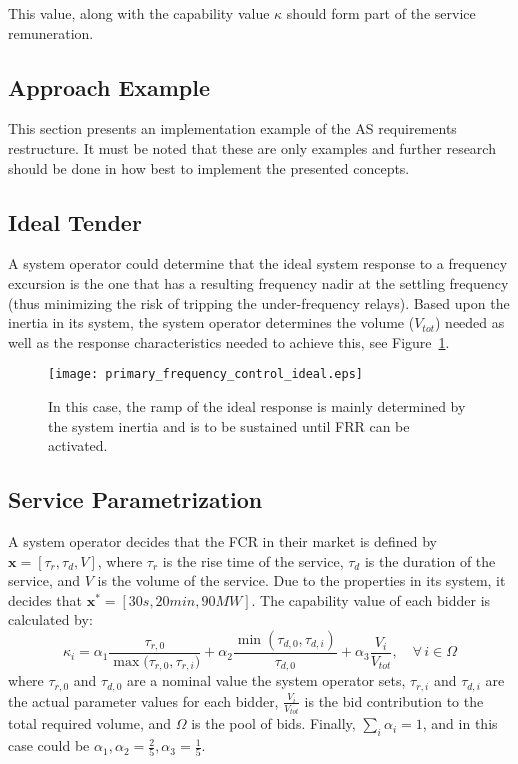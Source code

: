 This value, along with the capability value $\kappa$ should form part of the service remuneration. 
\subsection{Approach Example} %
\label{sub:ApproachExample}
This section presents an implementation example of the AS requirements restructure. It must be noted that these are only examples and further research should be done in how best to implement the presented concepts.
\subsection*{Ideal Tender}
A system operator could determine that the ideal system response to a frequency excursion is the one that has a resulting frequency nadir at the settling frequency (thus minimizing the risk of tripping the under-frequency relays). Based upon the inertia in its system, the system operator determines the volume ($V_{tot}$) needed as well as the response characteristics needed to achieve this, see Figure~\ref{fig:idealresponse}.

\begin{figure}[htbp!]
\centering
\texttt{[image: primary\_frequency\_control\_ideal.eps]}
\caption{In this case, the ramp of the ideal response is mainly determined by the system inertia and is to be sustained until FRR can be activated.}
\label{fig:idealresponse}
\end{figure}

\subsection*{Service Parametrization}
A system operator decides that the FCR in their market is defined by $\textbf{x} = [\tau_r,\tau_d,V]$, where $\tau_r$ is the rise time of the service, $\tau_d$ is the duration of the service, and $V$ is the volume of the service. Due to the properties in its system, it decides that $\textbf{x}^* = [30 s, 20 min, 90 MW]$. The capability value of each bidder is calculated by:
\begin{equation}
	\kappa_i = \alpha_1 \frac{\tau_{r,0}}{\max({\tau_{r,0},\tau_{r,i})}} + \alpha_2  \frac{\min(\tau_{d,0},\tau_{d,i})}{\tau_{d,0}} + \alpha_3 \frac{V_i}{V_{tot}}, \quad \forall \, i \in \Omega \label{eq:kappa_primfreq}
\end{equation}
where $\tau_{r,0}$ and $\tau_{d,0}$ are a nominal value the system operator sets, $\tau_{r,i}$ and $\tau_{d,i}$ are the actual parameter values for each bidder, $\frac{V_i}{V_{tot}}$ is the bid contribution to the total required volume, and $\Omega$ is the pool of bids. Finally, $\sum_{i} \alpha_i = 1$, and in this case could be $\alpha_1,\alpha_2 = \frac{2}{5}, \alpha_3 = \frac{1}{5}$.

